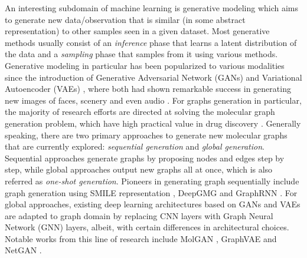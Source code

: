 An interesting subdomain of machine learning is generative modeling which aims
to generate new data/observation that is similar (in some abstract
representation) to other samples seen in a given dataset. Most generative
methods usually consist of an \textit{inference} phase that learns a latent
distribution of the data and a \textit{sampling} phase that samples from it
using various methods. Generative modeling in particular has been popularized to
various modalities since the introduction of Generative Adversarial Network
(GANs) \cite{goodfellowGenerativeAdversarialNetworks2014} and Variational
Autoencoder (VAEs) \cite{kingmaAutoEncodingVariationalBayes2014}, where both had
shown remarkable success in generating new images of faces, scenery and even
audio \cite{hersheyCNNArchitecturesLargescale2017}. For graphs generation in
particular, the majority of research efforts are directed at solving the
molecular graph generation problem, which have high practical value in drug
discovery \cite{wuComprehensiveSurveyGraph2021}. Generally speaking, there are
two primary approaches to generate new molecular graphs that are currently
explored: \textit{sequential generation} and \textit{global generation}.
Sequential approaches generate graphs by proposing nodes and edges step by step,
while global approaches output new graphs all at once, which is also referred as
\textit{one-shot generation}. Pioneers in generating graph sequentially include
graph generation using SMILE representation
\cite{daiSyntaxdirectedVariationalAutoencoder2018,
kusnerGrammarVariationalAutoencoder2017,
gomez-bombarelliAutomaticChemicalDesign2018}, DeepGMG
\cite{liLearningDeepGenerative2018} and GraphRNN
\cite{youGraphRNNGeneratingRealistic2018}. For global approaches, existing deep
learning architectures based on GANs and VAEs are adapted to graph domain by
replacing CNN layers with Graph Neural Network (GNN) layers, albeit, with certain differences in
architectural choices. Notable works from this line of research include MolGAN
\cite{decaoMolGANImplicitGenerative2018}, GraphVAE
\cite{simonovskyGraphVAEGenerationSmall2018} and NetGAN
\cite{bojchevskiNetGANGeneratingGraphs2018}.

